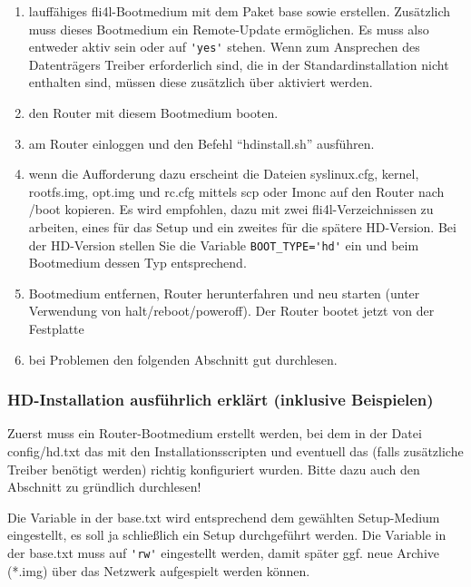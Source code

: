 \begin{enumerate}
    \item lauffähiges fli4l-Bootmedium mit dem Paket base
    sowie  erstellen. Zusätzlich muss dieses Bootmedium  
    ein Remote-Update ermöglichen. Es muss also entweder 
    aktiv sein oder  auf \verb*?'yes'? stehen. Wenn zum Ansprechen des 
    Datenträgers Treiber erforderlich sind, die in der Standardinstallation 
    nicht enthalten sind, müssen diese zusätzlich über  aktiviert 
    werden.
    \item den Router mit diesem Bootmedium booten.
    \item am Router einloggen und den Befehl ``hdinstall.sh'' ausführen.
    \item wenn die Aufforderung dazu erscheint die Dateien syslinux.cfg, kernel, rootfs.img,
    opt.img und rc.cfg mittels scp oder Imonc auf den Router nach /boot kopieren.
    Es wird empfohlen, dazu mit zwei fli4l-Verzeichnissen zu arbeiten, eines für das Setup 
    und ein zweites für die spätere HD-Version. Bei der HD-Version stellen Sie die Variable
    \verb*?BOOT_TYPE='hd'? ein und beim Bootmedium dessen Typ entsprechend.
    
    \item Bootmedium entfernen, Router herunterfahren und neu starten
      (unter Verwendung von halt/reboot/poweroff). Der Router bootet jetzt von der Festplatte
    \item bei Problemen den folgenden Abschnitt gut durchlesen.
\end{enumerate}


    \subsubsection{HD-Installation ausführlich erklärt (inklusive Beispielen)}

    Zuerst muss ein Router-Bootmedium erstellt werden, bei dem in der Datei
    config/hd.txt das  mit den Installationsscripten und eventuell 
    das  (falls zusätzliche Treiber benötigt werden) richtig 
    konfiguriert wurden.
    Bitte dazu auch den Abschnitt zu  gründlich durchlesen!

    Die Variable  in der base.txt wird entsprechend dem gewählten 
    Setup-Medium eingestellt, es soll ja schließlich ein Setup durchgeführt werden. 
    Die Variable  in der base.txt muss auf \verb*?'rw'? eingestellt werden,
    damit später ggf. neue Archive (*.img) über das Netzwerk aufgespielt werden können.

